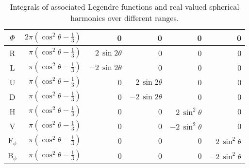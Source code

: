 \begin{table}[p]
\begin{tabular}{| c || r | r | r | r | r |}
    $\Phi$  &  $2\pi \left(\cos^2\theta - \frac{1}{3}\right)$
            &  0  &  0
            &  0  &  0  \\
    \hline

    R  &  $\pi \left(\cos^2\theta - \frac{1}{3}\right)$
       &  $2\, \sin2\theta$  &  0
       &  0  &  0  \\
    \hline

    L  &  $\pi \left(\cos^2\theta - \frac{1}{3}\right)$
       &  $-2\, \sin2\theta$  &  0
       &  0  &  0  \\
    \hline

    U  &  $\pi \left(\cos^2\theta - \frac{1}{3}\right)$
       &  0  &  $2\, \sin2\theta$
       &  0  &  0  \\
    \hline

    D  &  $\pi \left(\cos^2\theta - \frac{1}{3}\right)$
       &  0  &  $-2\, \sin2\theta$
       &  0  &  0  \\
    \hline

    H  &  $\pi \left(\cos^2\theta - \frac{1}{3}\right)$
       &  0  &  0
       &  $2\, \sin^2\theta$  &  0  \\
    \hline

    V  &  $\pi \left(\cos^2\theta - \frac{1}{3}\right)$
       &  0  &  0
       &  $-2\, \sin^2\theta$  &  0  \\
    \hline

    F$_\phi$  &  $\pi \left(\cos^2\theta - \frac{1}{3}\right)$
              &  0  &  0
              &  0  &  $2\, \sin^2\theta$  \\
    \hline

    B$_\phi$  &  $\pi \left(\cos^2\theta - \frac{1}{3}\right)$
              &  0  &  0
              &  0  &  $-2\, \sin^2\theta$  \\
    \hline
  \end{tabular}

  \caption{Integrals of associated Legendre functions and real-valued spherical harmonics over
     different ranges.}
  \label{tab:integrals}
\end{table}

\clearpage

